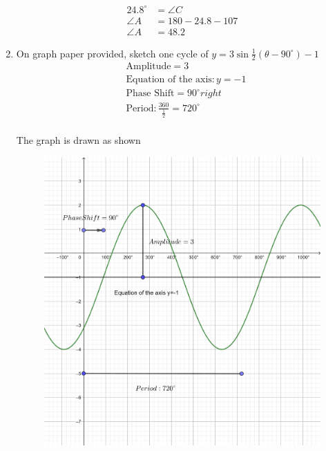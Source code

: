 \documentclass[paper=a4, fontsize=11pt]{scrartcl}
\begin{document}
\begin{enumerate}[resume]
\begin{align*}
        24.8^{\circ}&=\angle C\\
        \angle A &=180-24.8-107\\
        \angle A&=48.2
    \end{align*}
    \item On graph paper provided, sketch one cycle of $y=3\sin \frac{1}{2}(\theta-90^{\circ})-1$
    \begin{align*}
        &\text{Amplitude} = 3\\
        &\text{Equation of the axis}: y=-1\\
        &\text{Phase Shift} = 90^{\circ} right\\
        &\text{Period}: \frac{360}{\frac{1}{2}}=720^{\circ}\\
    \end{align*}
    
    The graph is drawn as shown
    \begin{figure}[h!]
        \centering
        \includegraphics[scale=0.03]{MathExamReview/13-graph1.png}
    \end{figure}


\end{enumerate}
\end{document}
